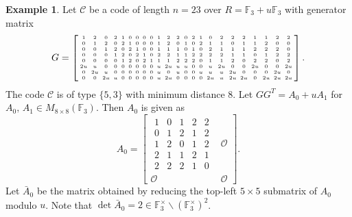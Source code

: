 \documentclass{article}
\theoremstyle{definition}
\newtheorem{example}{Example}[section]
\theoremstyle{remark}
\begin{document}
\begin{example}\label{odd-square}
    Let $\mathcal{C}$ be a code of length $n=23$ over $R=\mathbb{F}_3+u\mathbb{F}_3$ with generator matrix
    \[
    \begingroup
    \setlength{\arraycolsep}{2pt}
    \tiny
    G=
    \left[
    \begin{array}{ccccccccccccccccccccccc}
    1&2&0&2&1&0&0&0&0&1&2&2&0&2&1&0&2&2&2&1&1&2&2\\
    0&1&2&0&2&1&0&0&0&1&2&0&1&0&2&1&1&0&1&1&2&0&0\\
    0&0&1&2&0&2&1&0&0&1&1&1&0&1&0&2&1&1&1&2&2&2&0\\
    0&0&0&1&2&0&2&1&0&2&2&1&1&2&2&2&2&1&1&0&1&2&2\\
    0&0&0&0&1&2&0&2&1&1&1&2&2&2&0&1&1&2&0&2&2&0&2\\
    2u&u&0&0&0&0&0&0&0&u&2u&u&u&0&0&u&2u&0&0&2u&0&0&2u\\
    0&2u&u&0&0&0&0&0&0&u&0&u&0&0&u&u&u&2u&0&0&0&2u&0\\
    0&0&2u&u&0&0&0&0&0&u&2u&0&0&0&0&2u&u&2u&2u&0&2u&2u&2u
    \end{array}
    \right].
    \endgroup
    \]
    The code $\mathcal{C}$ is of type $\{5, 3\}$ with minimum distance 8. Let $GG^T=A_0+uA_1$ for $A_0,\,A_1\in M_{8\times 8}(\mathbb{F}_3)$. Then $A_0$ is given as
    \[
    A_0=\left[
    \begin{array}{c|c}
        \begin{matrix}
           1 & 0 & 1 & 2 & 2\\
           0 & 1 & 2 & 1 & 2\\
           1 & 2 & 0 & 1 & 2\\
           2 & 1 & 1 & 2 & 1\\
           2 & 2 & 2 & 1 & 0
        \end{matrix} & \mathcal{O}\\\hline
        \mathcal{O} & \mathcal{O}
    \end{array}
    \right].
    \]
    Let $\bar{A}_0$ be the matrix obtained by reducing the top-left $5\times 5$ submatrix of $A_0$ modulo $u$. Note that $\det\bar{A}_0=2\in \mathbb{F}_3^\times\backslash(\mathbb{F}_3^\times)^2$.
    

\end{example}
\end{document}
